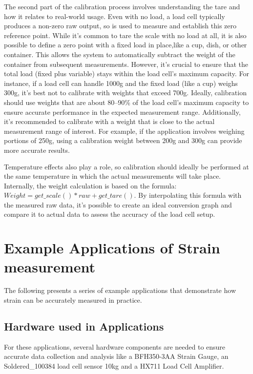 The second part of the calibration process involves understanding the tare and how it relates to real-world usage. Even with no load, a load cell typically produces a non-zero raw output, so  is used to measure and establish this zero reference point. While it’s common to tare the scale with no load at all, it is also possible to define a zero point with a fixed load in place,like a cup, dish, or other container. This allows the system to automatically subtract the weight of the container from subsequent measurements. However, it’s crucial to ensure that the total load (fixed plus variable) stays within the load cell’s maximum capacity. For instance, if a load cell can handle 1000g and the fixed load (like a cup) weighs 300g, it’s best not to calibrate with weights that exceed 700g. Ideally, calibration should use weights that are about 80–90\% of the load cell’s maximum capacity to ensure accurate performance in the expected measurement range. Additionally, it’s recommended to calibrate with a weight that is close to the actual measurement range of interest. For example, if the application involves weighing portions of 250g, using a calibration weight between 200g and 300g can provide more accurate results.

Temperature effects also play a role, so calibration should ideally be performed at the same temperature in which the actual measurements will take place. Internally, the weight calculation is based on the formula: $Weight = get\_scale() * raw + get\_tare()$.
By interpolating this formula with the measured raw data, it’s possible to create an ideal conversion graph and compare it to actual data to assess the accuracy of the load cell setup.

\section{Example Applications of Strain measurement}
The following presents a series of example applications that demonstrate how strain can be accurately measured in practice. 

\subsection{Hardware used in Applications}
For these applications, several hardware components are needed to ensure accurate data collection and analysis like a BFH350-3AA Strain Gauge, an Soldered\_100384 load cell sensor 10kg and a HX711 Load Cell Amplifier.

